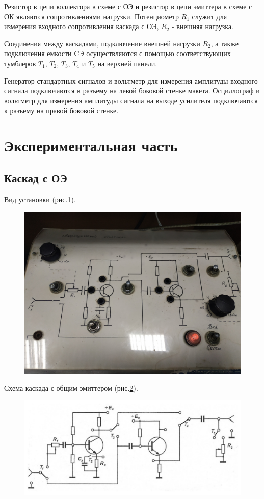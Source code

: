 Резистор в цепи коллектора в схеме с ОЭ и резистор в цепи эмиттера в схеме с ОК являются сопротивлениями нагрузки. Потенциометр $R_1$ служит для измерения входного сопротивления
каскада с ОЭ, $R_2$ - внешняя нагрузка.

Соединения между каскадами, подключение внешней нагрузки $R_2$, а также подключения емкости CЭ осуществляются с помощью соответствующих тумблеров $T_1$, $T_2$, $T_3$, $T_4$ и $T_5$ на верхней панели.

Генератор стандартных сигналов и вольтметр для измерения амплитуды входного сигнала подключаются к разъему на левой боковой стенке макета. Осциллограф и вольтметр для измерения амплитуды сигнала на выходе усилителя подключаются к разъему на правой боковой стенке.

\section{Экспериментальная часть}
\subsection{Каскад с ОЭ}
Вид установки (рис.\ref{fig:8}).
\begin{figure}[H]
	\centering
	\includegraphics[width=0.7\linewidth]{fig/fig12}
	\caption{}
	\label{fig:8}
\end{figure}
Схема каскада с общим эмиттером (рис.\ref{fig:9}). 

\begin{figure}[h!]
	\centering
	\includegraphics[width=0.8\linewidth]{fig/fig81}
	\caption{}
	\label{fig:9}
\end{figure}


